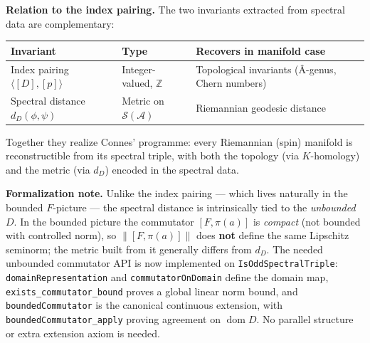 \documentclass[
  11pt,
]{article}
\newcounter{none} %
\begin{document}
\textbf{Relation to the index pairing.} The two invariants extracted
from spectral data are complementary:

{\def\LTcaptype{none} %
\begin{longtable}[]{@{}
  >{\raggedright\arraybackslash}p{}
  >{\raggedright\arraybackslash}p{}
  >{\raggedright\arraybackslash}p{}@{}}
\toprule\noalign{}
\begin{minipage}[b]{\linewidth}\raggedright
Invariant
\end{minipage} & \begin{minipage}[b]{\linewidth}\raggedright
Type
\end{minipage} & \begin{minipage}[b]{\linewidth}\raggedright
Recovers in manifold case
\end{minipage} \\
\midrule\noalign{}
\endhead
\bottomrule\noalign{}
\endlastfoot
Index pairing \(\langle [D], [p]\rangle\) & Integer-valued,
\(\mathbb{Z}\) & Topological invariants (Â-genus, Chern numbers) \\
Spectral distance \(d_D(\phi, \psi)\) & Metric on
\(\mathcal{S}(\mathcal{A})\) & Riemannian geodesic distance \\
\end{longtable}
}

Together they realize Connes' programme: every Riemannian (spin)
manifold is reconstructible from its spectral triple, with both the
topology (via \(K\)-homology) and the metric (via \(d_D\)) encoded in
the spectral data.

\textbf{Formalization note.} Unlike the index pairing --- which lives
naturally in the bounded \(F\)-picture --- the spectral distance is
intrinsically tied to the \emph{unbounded} \(D\). In the bounded picture
the commutator \([F, \pi(a)]\) is \emph{compact} (not bounded with
controlled norm), so \(\|[F, \pi(a)]\|\) does \textbf{not} define the
same Lipschitz seminorm; the metric built from it generally differs from
\(d_D\). The needed unbounded commutator API is now implemented on
\texttt{IsOddSpectralTriple}: \texttt{domainRepresentation} and
\texttt{commutatorOnDomain} define the domain map,
\texttt{exists\_commutator\_bound} proves a global linear norm bound,
and \texttt{boundedCommutator} is the canonical continuous extension,
with \texttt{boundedCommutator\_apply} proving agreement on
\(\mathop{\mathrm{dom}}D\). No parallel structure or extra extension
axiom is needed.
\end{document}
